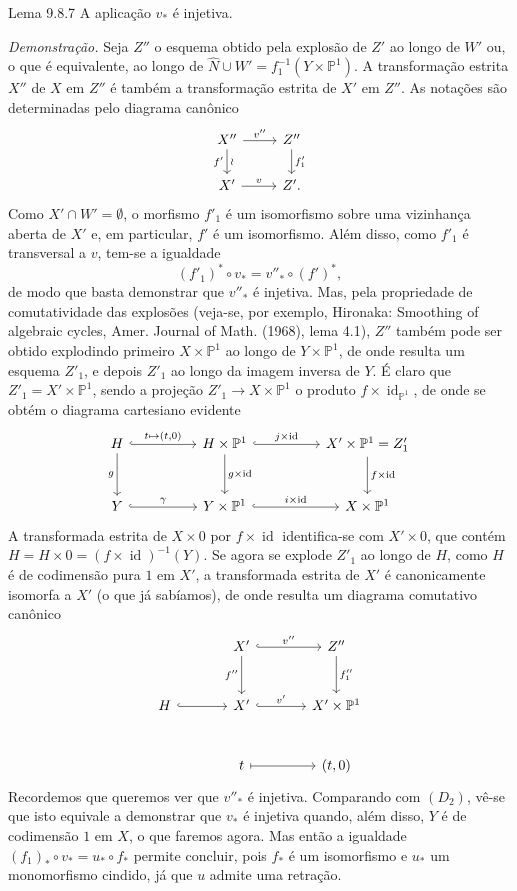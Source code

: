 \begin{statement}{Lema 9.8.7}
A aplicação $v_*$ é injetiva.
\end{statement}

\emph{Demonstração.} Seja $Z''$ o esquema obtido pela explosão de $Z'$ ao longo de $W'$ ou, o que é equivalente, ao longo de $\widehat N\cup W'=f_1^{-1}(Y\times\mathbb P^1)$. A transformação estrita $X''$ de $X$ em $Z''$ é também a transformação estrita de $X'$ em $Z''$. As notações são determinadas pelo diagrama canônico
\[
\begin{tikzcd}
X''\arrow[r,"v''"]\arrow[d,"f'"',"\wr"]&Z''\arrow[d,"f'_1"]\\
X'\arrow[r,"v"]&Z'.
\end{tikzcd}
\]
Como $X'\cap W'=\emptyset$, o morfismo $f'_1$ é um isomorfismo sobre uma vizinhança aberta de $X'$ e, em particular, $f'$ é um isomorfismo. Além disso, como $f'_1$ é transversal a $v$, tem-se a igualdade
\[
(f'_1)^*\circ v_*=v''_*\circ(f')^*,
\tag{9.8.8}
\]
de modo que basta demonstrar que $v''_*$ é injetiva. Mas, pela propriedade de comutatividade das explosões (veja-se, por exemplo, Hironaka: Smoothing of algebraic cycles, Amer. Journal of Math. (1968), lema 4.1), $Z''$ também pode ser obtido explodindo primeiro $X\times\mathbb P^1$ ao longo de $Y\times\mathbb P^1$, de onde resulta um esquema $Z'_1$, e depois $Z'_1$ ao longo da imagem inversa de $Y$. É claro que $Z'_1=X'\times\mathbb P^1$, sendo a projeção $Z'_1\to X\times\mathbb P^1$ o produto $f\times\operatorname{id}_{\mathbb P^1}$, de onde se obtém o diagrama cartesiano evidente
\[
\begin{tikzcd}[column sep=huge,row sep=large]
H\arrow[r,hook,"{t\mapsto(t,0)}"]\arrow[d,"g"']&H\times\mathbb P^1\arrow[r,hook,"{j\times\operatorname{id}}"]\arrow[d,"{g\times\operatorname{id}}"]&X'\times\mathbb P^1=Z'_1\arrow[d,"{f\times\operatorname{id}}"]\\
Y\arrow[r,hook,"\gamma"]&Y\times\mathbb P^1\arrow[r,hook,"{i\times\operatorname{id}}"]&X\times\mathbb P^1
\end{tikzcd}
\]
A transformada estrita de $X\times0$ por $f\times\operatorname{id}$ identifica-se com $X'\times0$, que contém $H=H\times0=(f\times\operatorname{id})^{-1}(Y)$. Se agora se explode $Z'_1$ ao longo de $H$, como $H$ é de codimensão pura $1$ em $X'$, a transformada estrita de $X'$ é canonicamente isomorfa a $X'$ (o que já sabíamos), de onde resulta um diagrama comutativo canônico
\[
\begin{tikzcd}[column sep=large,row sep=large]
&X'\arrow[r,hook,"v''"]\arrow[d,"f''"']&Z''\arrow[d,"f''_1"]\\
H\arrow[r,hook]&X'\arrow[r,hook,"v'"]&X'\times\mathbb P^1\\
&t\arrow[r,mapsto]&{(t,0)}
\end{tikzcd}
\]
Recordemos que queremos ver que $v''_*$ é injetiva. Comparando com $(D_2)$, vê-se que isto equivale a demonstrar que $v_*$ é injetiva quando, além disso, $Y$ é de codimensão $1$ em $X$, o que faremos agora. Mas então a igualdade $(f_1)_*\circ v_*=u_*\circ f_*$ permite concluir, pois $f_*$ é um isomorfismo e $u_*$ um monomorfismo cindido, já que $u$ admite uma retração.

